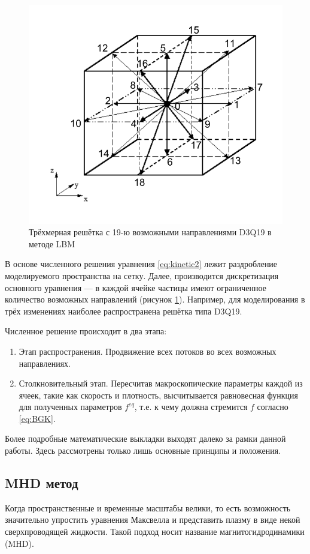 \begin{figure}
\centering
\includegraphics[width=0.6\linewidth]{./fig/ch1/D3Q19}
\caption{Трёхмерная решётка с 19-ю возможными направлениями D3Q19 в методе LBM}
\label{fig:D3Q19}
\end{figure}

В основе численного решения уравнения \eqref{eq:kinetic2} лежит раздробление моделируемого пространства на сетку. Далее, производится дискретизация основного уравнения --- в каждой ячейке частицы имеют ограниченное количество возможных направлений (рисунок \ref{fig:D3Q19}). Например, для моделирования в трёх изменениях наиболее распространена решётка типа D3Q19.

Численное решение происходит в два этапа:
\begin{enumerate}
\item Этап распространения. Продвижение всех потоков во всех возможных направлениях.
\item Столкновительный этап. Пересчитав макроскопические параметры каждой из ячеек, такие как скорость и плотность, высчитывается равновесная функция для полученных параметров $f^{eq}$, т.е. к чему должна стремится $f$ согласно \eqref{eq:BGK}.
\end{enumerate}

Более подробные математические выкладки выходят далеко за рамки данной работы. Здесь рассмотрены только лишь основные принципы и положения.

\subsection{MHD метод}

Когда пространственные и временные масштабы велики, то есть возможность значительно упростить уравнения Максвелла и представить плазму в виде некой сверхпроводящей жидкости. Такой подход носит название магнитогидродинамики (MHD).

